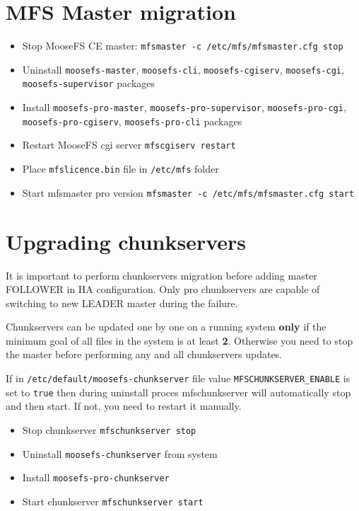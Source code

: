 \documentclass[a4paper,11pt,english]{report}
\def\code#1{\texttt{#1}}
\begin{document}
	\bigskip

				
		\section{MFS Master migration}
		\begin{itemize}
			\item Stop MooseFS CE master: \code{mfsmaster -c /etc/mfs/mfsmaster.cfg stop}
			\item Uninstall \code{moosefs-master}, \code{moosefs-cli}, \code{moosefs-cgiserv}, \code{moosefs-cgi}, \code{moosefs-supervisor} packages
			\item Install \code{moosefs-pro-master}, \code{moosefs-pro-supervisor}, \code{moosefs-pro-cgi}, \code{moosefs-pro-cgiserv}, \code{moosefs-pro-cli} packages
			\item Restart MooseFS cgi server \code{mfscgiserv restart}
			\item Place \code{mfslicence.bin} file in \code{/etc/mfs} folder
			\item Start mfsmaster pro version \code{mfsmaster -c /etc/mfs/mfsmaster.cfg start}
		\end{itemize}
		
			\section{Upgrading chunkservers}
		It is important to perform chunkservers migration before adding master FOLLOWER in HA configuration. Only pro chunkservers are capable of switching to new LEADER master during the failure.
		
		Chunkservers can be updated one by one on a running system \textbf{only} if the minimum goal of all files in the system is at least \textbf{2}. Otherwise you need to stop the master before performing any and all chunkservers updates.
		
		If in \code{/etc/default/moosefs-chunkserver} file value \code{MFSCHUNKSERVER\_ENABLE} is set to \code{true} then during uninstall proces mfschunkserver will automatically stop and then start. If not, you need to restart it manually.
		
		\begin{itemize}
			\item Stop chunkserver \code{mfschunkserver stop}
			\item Uninstall \code{moosefs-chunkserver} from system
			\item Install \code{moosefs-pro-chunkserver}
			\item Start chunkserver \code{mfschunkserver start}
		\end{itemize}
		
\end{document}
